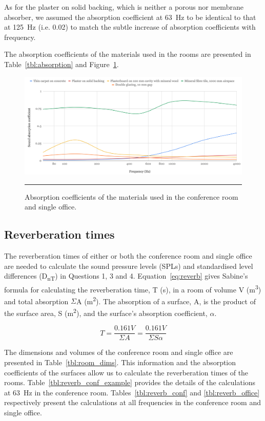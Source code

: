 As for the plaster on solid backing, which is neither a porous nor membrane absorber, we assumed the absorption coefficient at 63~Hz to be identical to that at 125~Hz (i.e. 0.02) to match the subtle increase of absorption coefficients with frequency.

The absorption coefficients of the materials used in the rooms are presented in Table~\ref{tbl:absorption} and Figure~\ref{fig:absorption_coefs}.


\begin{figure}[htbp]
	\centering
	\includegraphics[width=\textwidth]{figures/Materials_absorption.png}
	\rule{\textwidth}{0.5pt} %
	\caption{Absorption coefficients of the materials used in the conference room and single office.}
	\label{fig:absorption_coefs}
\end{figure}




\subsection{Reverberation times}

The reverberation times of either or both the conference room and single office are needed to calculate the sound pressure levels (SPLs) and standardised level differences (D\textsubscript{nT}) in Questions 1, 3 and 4.
Equation~\ref{eq:reverb} gives Sabine's formula for calculating the reverberation time, T (s), in a room of volume V (m\textsuperscript{3}) and total absorption $\Sigma$A (m\textsuperscript{2}).
The absorption of a surface, A, is the product of the surface area, S (m\textsuperscript{2}), and the surface's absorption coefficient, $\alpha$.

    \begin{equation}\label{eq:reverb}
		T = \frac{0.161 V}{\Sigma A} = \frac{0.161 V}{\Sigma S \alpha}
	\end{equation}

The dimensions and volumes of the conference room and single office are presented in Table~\ref{tbl:room_dims}.
This information and the absorption coefficients of the surfaces allow us to calculate the reverberation times of the rooms.
Table~\ref{tbl:reverb_conf_example} provides the details of the calculations at 63~Hz in the conference room.
Tables~\ref{tbl:reverb_conf} and \ref{tbl:reverb_office} respectively present the calculations at all frequencies in the conference room and single office.

